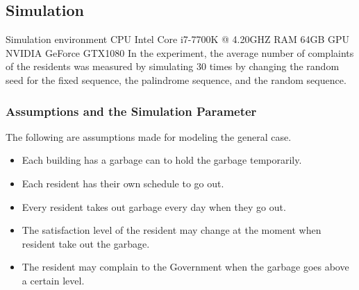 \documentclass{scsSimAUDPaperFormat}
\begin{document}
\subsection{Simulation}
Simulation environment
CPU Intel Core i7-7700K @ 4.20GHZ
RAM 64GB
GPU NVIDIA GeForce GTX1080
In the experiment, the average number of complaints of the residents was measured by simulating 30 times by changing the random seed for the fixed sequence, the palindrome sequence, and the random sequence.

\subsubsection{Assumptions and the Simulation Parameter}

The following are assumptions made for modeling the general case.
\begin{itemize}
    \item Each building has a garbage can to hold the garbage temporarily.
    \item Each resident has their own schedule to go out.
    \item Every resident takes out garbage every day when they go out. 
    \item The satisfaction level of the resident may change at the moment when resident take out the garbage.
    \item The resident may complain to the Government when the garbage goes above a certain level.
\end{itemize}
\end{document}
